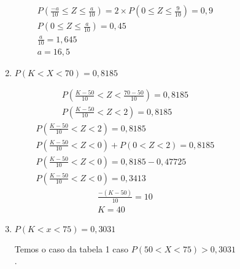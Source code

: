 \begin{description}
\begin{description}
\begin{description}
\begin{enumerate}[label=(\alph*)]
 \begin{figure}[H]
            \centering
            
            \label{fig:}
          \end{figure}

\begin{align*}
  P( \frac{-a}{10} \leq Z \leq \frac{a}{10} ) = 2 \times P(0 \leq Z \leq \frac{9}{10})= 0,9 \\
  P(0 \leq Z \leq \frac{a}{10})=0,45 \\
  \frac{a}{10}= 1,645 \\
  a = 16,5
\end{align*}
  \item $P(K< X <70)=0,8185$
 \begin{figure}[H]
            \centering
            
            \label{fig:}
          \end{figure}


    \begin{align*}
      P( \frac{K-50}{10} < Z < \frac{70-50}{10} ) = 0,8185 \\
      P(\frac{K-50}{10} < Z < 2) =0,8185
    \end{align*}
    \begin{align*}
      P( \frac{K-50}{10}<Z<2 )  = 0,8185 \\
      P( \frac{K-50}{10} < Z <0) + P(0 < Z <2) =0,8185 \\
      P(\frac{K-50}{10}<Z < 0) = 0,8185 - 0,47725 \\
      P( \frac{K-50}{10} < Z < 0 ) =0,3413
    \end{align*}
    \begin{align*}
      \frac{-(K-50)}{10} = 10 \\
      K= 40
    \end{align*}
  \item $P(K < x <75)= 0,3031$

    Temos o caso da tabela 1 caso $P(50 < X < 75) > 0,3031$.
    

\end{enumerate}
\end{description}
\end{description}
\end{description}
